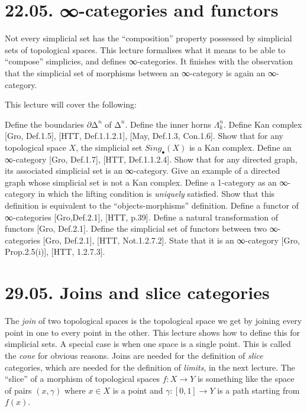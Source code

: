 \documentclass[a4paper]{amsart}
\numberwithin{figure}{section}
\theoremstyle{theorem}
\theoremstyle{definition}
\begin{document}
\section{22.05. ∞-categories and functors} %

Not every simplicial set has the ``composition'' property possessed by simplicial sets of topological spaces. This lecture formalises what it means to be able to ``compose'' simplicies, and defines ∞-categories. It finishes with the observation that the simplicial set of morphisms between an ∞-category is again an ∞-category.

This lecture will cover the following:

Define the boundaries $\partial ∆^n$ of $∆^n$. %
Define the inner horns $\Lambda^n_k$. %
Define Kan complex [Gro, Def.1.5], [HTT, Def.1.1.2.1], [May, Def.1.3, Con.1.6]. %
Show that for any topological space $X$, the simplicial set $Sing_\bullet(X)$ is a Kan complex. %
Define an ∞-category [Gro, Def.1.7], [HTT, Def.1.1.2.4]. %
Show that for any directed graph, its associated simplicial set is an ∞-category. Give an example of a directed graph whose simplicial set is not a Kan complex. %
Define a 1-category as an ∞-category in which the lifting condition is \emph{uniquely} satisfied. Show that this definition is equivalent to the ``objects-morphisms'' definition. %
Define a functor of ∞-categories [Gro,Def.2.1], [HTT, p.39]. %
Define a natural transformation of functors [Gro, Def.2.1]. %
Define the simplicial set of functors between two ∞-categories [Gro, Def.2.1], [HTT, Not.1.2.7.2]. %
State that it is an ∞-category [Gro, Prop.2.5(i)], [HTT, 1.2.7.3]. %


\section{29.05. Joins and slice categories}

The \emph{join} of two topological spaces is the topological space we get by joining every point in one to every point in the other. This lecture shows how to define this for simplicial sets. A special case is when one space is a single point. This is called the \emph{cone} for obvious reasons. Joins are needed for the definition of \emph{slice} categories, which are needed for the definition of \emph{limits}, in the next lecture. The ``slice'' of a morphism of topological spaces $f: X \to Y$ is something like the space of pairs $(x, \gamma)$ where $x \in X$ is a point and $\gamma: [0, 1] \to Y$ is a path starting from $f(x)$.
\end{document}
